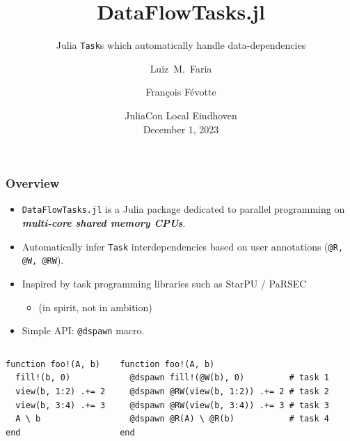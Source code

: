 \documentclass{beamer}
\title[DataFlowTasks] %
{DataFlowTasks.jl}
\subtitle{Julia \texttt{Task}s which automatically handle data-dependencies}
\author[Faria, Févotte] %
{Luiz~M.~Faria\inst{1} \and François Févotte\inst{2}}
\institute[]
{
    \inst{1}%
    Research scientist\\
    INRIA
    \and
    \inst{2}%
    Chief Scientist\\
    TriScale innov
}
\date[JuliaCon Local Eindhoven]{JuliaCon Local Eindhoven\\December 1, 2023}
\newcommand{\DFT}{\texttt{DataFlowTasks.jl}}
\begin{document}
\frame{\titlepage}

\begin{frame}[fragile]
\frametitle{Overview}

\begin{itemize}
    \item \DFT{} is a Julia package dedicated to parallel programming on
      \textit{\textbf{multi-core shared memory CPUs}}.
    \item Automatically infer \texttt{Task} interdependencies based on user annotations (\texttt{@R, @W, @RW}).
    \item Inspired by task programming libraries such as StarPU / PaRSEC
      \begin{itemize}
      \item (in spirit, not in ambition)
      \end{itemize}
    \item Simple API: \texttt{@dspawn} macro.
\end{itemize}
%
\begin{columns}[t]
\begin{exampleblock}{}
\begin{verbatim}
function foo!(A, b)
  fill!(b, 0)
  view(b, 1:2) .+= 2
  view(b, 3:4) .+= 3
  A \ b
end
\end{verbatim}
\end{exampleblock}
\center {}
 

\begin{exampleblock}{}
\begin{verbatim}
function foo!(A, b)
  @dspawn fill!(@W(b), 0)         # task 1
  @dspawn @RW(view(b, 1:2)) .+= 2 # task 2
  @dspawn @RW(view(b, 3:4)) .+= 3 # task 3
  @dspawn @R(A) \ @R(b)           # task 4
end
\end{verbatim}
\end{exampleblock}
\center {}

\end{columns}


\end{frame}
\end{document}
